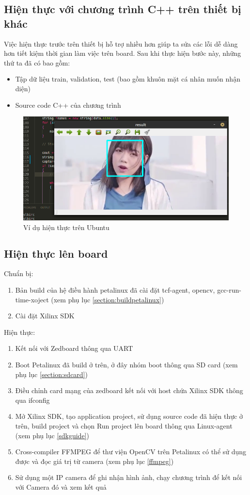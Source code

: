 \documentclass[a4paper]{report}
\begin{document}
\subsection{Hiện thực với chương trình C++ trên thiết bị khác}
Việc hiện thực trước trên thiết bị hỗ trợ nhiều hơn giúp ta sửa các lỗi dễ dàng hơn tiết kiệm thời gian làm việc trên board. Sau khi thực hiện bước này, những thứ ta đã có bao gồm:
\begin{itemize}
\item Tập dữ liệu train, validation, test (bao gồm khuôn mặt cá nhân muốn nhận diện)
\item Source code C++ của chương trình
\end{itemize}
%
\begin{figure}[H]
\label{baohan}
\centering
\includegraphics[scale=.5]{../images/fig/baohan.png}
\caption{Ví dụ hiện thực trên Ubuntu}
\end{figure}
%
\subsection{Hiện thực lên board}
Chuẩn bị:
\begin{enumerate}
\item Bản build của hệ điều hành petalinux đã cài đặt tcf-agent, opencv, gcc-run-time-xoject (xem phụ lục  \ref{section:buildpetalinux})
\item Cài đặt Xilinx SDK
\end{enumerate}
Hiện thực:
\begin{enumerate}
\item Kết nối với Zedboard thông qua UART
\item Boot Petalinux đã build ở trên, ở đây nhóm boot thông qua SD card (xem phụ lục \ref{section:sdcard})
\item Điều chỉnh card mạng của zedboard kết nối với host chứa Xilinx SDK thông qua ifconfig 
\item Mở Xilinx SDK, tạo application project, sử dụng source code đã hiện thực ở trên, build project và chọn Run project lên board thông qua Linux-agent (xem phụ lục \ref{sdkguide})
\item Cross-compiler FFMPEG để thư viện OpenCV trên Petalinux có thể sử dụng được và đọc giá trị từ camera (xem phụ lục \ref{ffmpeg})
\item Sử dụng một IP camera để ghi nhận hình ảnh, chạy chương trình để kết nối với Camera đó và xem kết quả

\end{enumerate}
\end{document}
